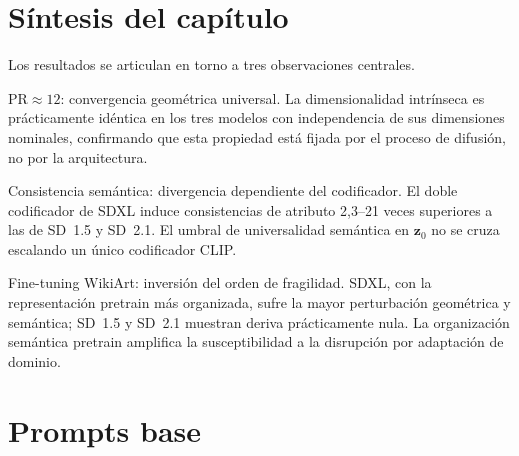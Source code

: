\documentclass[12pt, a4paper, twoside]{book}
\newcommand{\z}{\mathbf{z}}
\begin{document}
\section*{Síntesis del capítulo}

\noindent
Los resultados se articulan en torno a tres observaciones centrales.

\medskip
\noindent PR$\approx 12$: convergencia geométrica universal.
La dimensionalidad intrínseca es prácticamente idéntica en los tres modelos con independencia
de sus dimensiones nominales, confirmando que esta propiedad está fijada por el proceso de
difusión, no por la arquitectura.

\medskip
\noindent Consistencia semántica: divergencia dependiente del codificador.
El doble codificador de SDXL induce consistencias de atributo 2,3--21 veces superiores a las
de SD~1.5 y SD~2.1. El umbral de universalidad semántica en $\z_0$ no se cruza escalando un
único codificador CLIP.

\medskip
\noindent Fine-tuning WikiArt: inversión del orden de fragilidad.
SDXL, con la representación pretrain más organizada, sufre la mayor perturbación geométrica
y semántica; SD~1.5 y SD~2.1 muestran deriva prácticamente nula. La organización semántica
pretrain amplifica la susceptibilidad a la disrupción por adaptación de dominio.



\appendix

\label{app:prompts}

\section{Prompts base}
\end{document}

